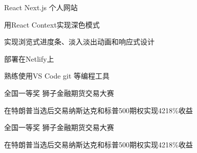 

\begin{cventries}

  \cventry
    {React Next.js} %
    {个人网站} %
    {} %
    {} %
    {
      \begin{cvitems} %
        \item {用React Context实现深色模式}
        \item {实现浏览式进度条、淡入淡出动画和响应式设计}
        \item {部署在Netlify上}
        \item {熟练使用VS Code git 等编程工具}
      \end{cvitems}
    }


\cventry
{全国一等奖} %
{狮子金融期货交易大赛} %
{} %
{} %
{
  \begin{cvitems} %
    \item {在特朗普当选后交易纳斯达克和标普500期权实现4218\%收益}
  \end{cvitems}
  }

\cventry
  {全国一等奖} %
  {狮子金融期货交易大赛} %
  {} %
  {} %
{
  \begin{cvitems} %
    \item {在特朗普当选后交易纳斯达克和标普500期权实现4218\%收益}
  \end{cvitems}
  }
\end{cventries}



